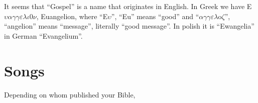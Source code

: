 \documentclass[a4paper,11pt]{article}
\begin{document}
It seems that ``Gospel'' is a name that originates in English. In Greek we
have E$\upsilon \alpha \gamma \gamma \varepsilon \lambda \iota$0$\nu$, Euangelion, where ``E$\upsilon$'', ``Eu'' means ``good''
and ``$\alpha \gamma \gamma \varepsilon \lambda$o$\zeta$'', ``angelion'' means ``message'', literally ``good
message''. In polish it is ``Ewangelia'' in German ``Evangelium''.








\section{Songs} %



Depending on whom published your Bible,






{}






\end{document}
